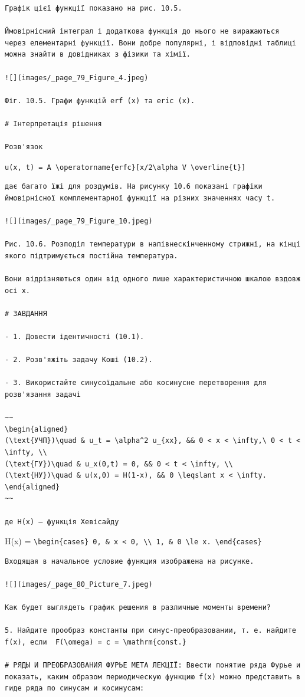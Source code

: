 \documentclass[
  ukrainian,
]{article}
\begin{document}
\begin{verbatim}
Графік цієї функції показано на рис. 10.5.

Ймовірнісний інтеграл і додаткова функція до нього не виражаються через елементарні функції. Вони добре популярні, і відповідні таблиці можна знайти в довідниках з фізики та хімії.

![](images/_page_79_Figure_4.jpeg)

Фіг. 10.5. Графи функцій erf (x) та eric (x).

# Інтерпретація рішення

Розв'язок
\end{verbatim}

\texttt{u(x,\ t)\ =\ A\ \textbackslash{}operatorname\{erfc\}{[}x/2\textbackslash{}alpha\ V\ \textbackslash{}overline\{t\}{]}}

\begin{verbatim}
дає багато їжі для роздумів. На рисунку 10.6 показані графіки ймовірнісної комплементарної функції на різних значеннях часу t.

![](images/_page_79_Figure_10.jpeg)

Рис. 10.6. Розподіл температури в напівнескінченному стрижні, на кінці якого підтримується постійна температура.

Вони відрізняються один від одного лише характеристичною шкалою вздовж осі x.

# ЗАВДАННЯ

- 1. Довести ідентичності (10.1).

- 2. Розв'яжіть задачу Коші (10.2).

- 3. Використайте синусоїдальне або косинусне перетворення для розв'язання задачі

~~
\begin{aligned}
(\text{УЧП})\quad & u_t = \alpha^2 u_{xx}, && 0 < x < \infty,\ 0 < t < \infty, \\
(\text{ГУ})\quad & u_x(0,t) = 0, && 0 < t < \infty, \\
(\text{НУ})\quad & u(x,0) = H(1-x), && 0 \leqslant x < \infty.
\end{aligned}
~~

де H(x) — функція Хевісайду
\end{verbatim}

H(x) =
\texttt{\textbackslash{}begin\{cases\}\ 0,\ \&\ x\ \textless{}\ 0,\ \textbackslash{}\textbackslash{}\ 1,\ \&\ 0\ \textbackslash{}le\ x.\ \textbackslash{}end\{cases\}}

\begin{verbatim}
Входящая в начальное условие функция изображена на рисунке.

![](images/_page_80_Picture_7.jpeg)

Как будет выглядеть график решения в различные моменты времени?

5. Найдите прообраз константы при синус-преобразовании, т. е. найдите f(x), если  F(\omega) = c = \mathrm{const.} 

# РЯДЫ И ПРЕОБРАЗОВАНИЯ ФУРЬЕ МЕТА ЛЕКЦІЇ: Ввести понятие ряда Фурье и показать, каким образом периодическую функцию f(x) можно представить в гиде ряда по синусам и косинусам:
\end{verbatim}
\end{document}
